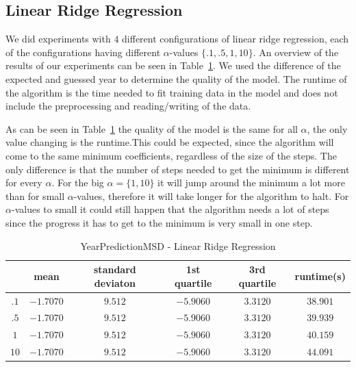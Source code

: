 \subsection{Linear Ridge Regression}\label{ds2:lrr}
We did experiments with $4$ different configurations of linear ridge regression, each of the configurations having different $\alpha$-values $\{.1,.5,1,10\}$. An overview of the results of our experiments can be seen in Table~\ref{ypmsd:table:lrrresults}. We used the difference of the expected and guessed year to determine the quality of the model. The runtime of the algorithm is the time needed to fit training data in the model and does not include the preprocessing and reading/writing of the data.\par
As can be seen in Table~\ref{ypmsd:table:lrrresults} the quality of the model is the same for all $\alpha$, the only value changing is the runtime.This could be expected, since the algorithm will come to the same minimum coefficients, regardless of the size of the steps. The only difference is that the number of steps needed to get the minimum is different for every $\alpha$. For the big $\alpha=\{1,10\}$ it will jump around the minimum a lot more than for small $\alpha$-values, therefore it will take longer for the algorithm to halt. For $\alpha$-values to small it could still happen that the algorithm needs a lot of steps since the progress it has to get to the minimum is very small in one step.
\begin{table}[p]
	\begin{center}
		\begin{tabular}{|c|c|c|c|c|c|}
			\hline	\backslashbox{$\alpha$}{}&mean&standard deviaton&1st quartile&3rd quartile&runtime(s)\\
\hline$.1$&$-1.7070$&$9.512$&$-5.9060$&$3.3120$&$38.901$\\
\hline$.5$&$-1.7070$&$9.512$&$-5.9060$&$3.3120$&$39.939$\\
\hline$1$&$-1.7070$&$9.512$&$-5.9060$&$3.3120$&$40.159$\\
\hline$10$&$-1.7070$&$9.512$&$-5.9060$&$3.3120$&$44.091$\\\hline
\end{tabular}
\end{center}
\caption{YearPredictionMSD - Linear Ridge Regression\label{ypmsd:table:lrrresults}}
\end{table}
